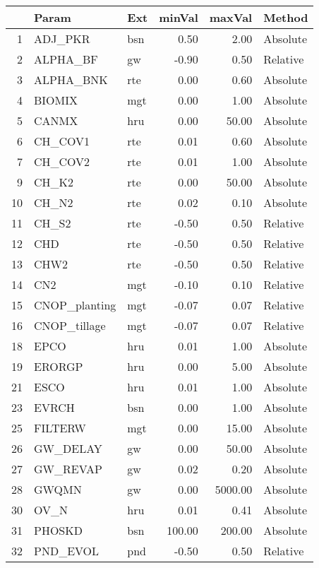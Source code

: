\begin{table}[ht]
\centering
\begin{tabular}{rllrrl}
  \hline
 & Param & Ext & minVal & maxVal & Method \\ 
  \hline
1 & ADJ\_PKR & bsn & 0.50 & 2.00 & Absolute \\ 
  2 & ALPHA\_BF & gw & -0.90 & 0.50 & Relative \\ 
  3 & ALPHA\_BNK & rte & 0.00 & 0.60 & Absolute \\ 
  4 & BIOMIX & mgt & 0.00 & 1.00 & Absolute \\ 
  5 & CANMX & hru & 0.00 & 50.00 & Absolute \\ 
  6 & CH\_COV1 & rte & 0.01 & 0.60 & Absolute \\ 
  7 & CH\_COV2 & rte & 0.01 & 1.00 & Absolute \\ 
  9 & CH\_K2 & rte & 0.00 & 50.00 & Absolute \\ 
  10 & CH\_N2 & rte & 0.02 & 0.10 & Absolute \\ 
  11 & CH\_S2 & rte & -0.50 & 0.50 & Relative \\ 
  12 & CHD & rte & -0.50 & 0.50 & Relative \\ 
  13 & CHW2 & rte & -0.50 & 0.50 & Relative \\ 
  14 & CN2 & mgt & -0.10 & 0.10 & Relative \\ 
  15 & CNOP\_planting & mgt & -0.07 & 0.07 & Relative \\ 
  16 & CNOP\_tillage & mgt & -0.07 & 0.07 & Relative \\ 
  18 & EPCO & hru & 0.01 & 1.00 & Absolute \\ 
  19 & ERORGP & hru & 0.00 & 5.00 & Absolute \\ 
  21 & ESCO & hru & 0.01 & 1.00 & Absolute \\ 
  23 & EVRCH & bsn & 0.00 & 1.00 & Absolute \\ 
  25 & FILTERW & mgt & 0.00 & 15.00 & Absolute \\ 
  26 & GW\_DELAY & gw & 0.00 & 50.00 & Absolute \\ 
  27 & GW\_REVAP & gw & 0.02 & 0.20 & Absolute \\ 
  28 & GWQMN & gw & 0.00 & 5000.00 & Absolute \\ 
  30 & OV\_N & hru & 0.01 & 0.41 & Absolute \\ 
  31 & PHOSKD & bsn & 100.00 & 200.00 & Absolute \\ 
  32 & PND\_EVOL & pnd & -0.50 & 0.50 & Relative \\ 

\end{tabular}
\end{table}
